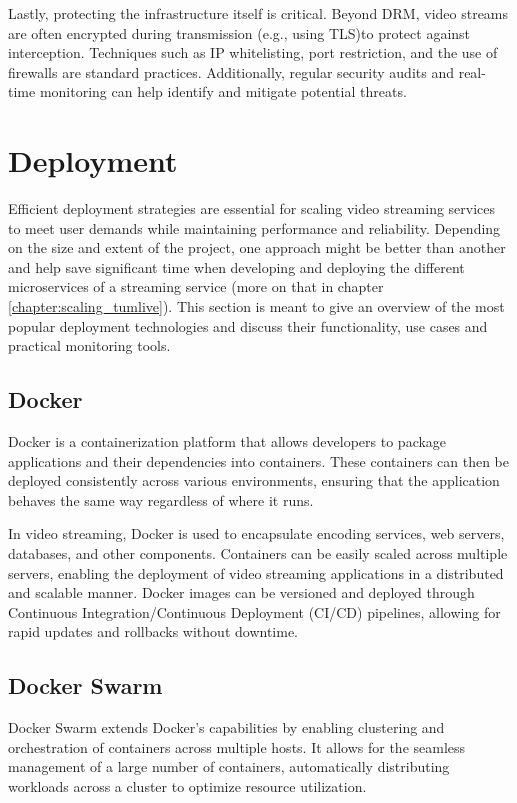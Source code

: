 Lastly, protecting the infrastructure itself is critical. Beyond DRM, video streams are often encrypted during transmission (e.g., using \ac{TLS})to protect against interception. Techniques such as IP whitelisting, port restriction, and the use of firewalls are standard practices. Additionally, regular security audits and real-time monitoring can help identify and mitigate potential threats\cite{network_security}.

\section{Deployment}
Efficient deployment strategies are essential for scaling video streaming services to meet user demands while maintaining performance and reliability. Depending on the size and extent of the project, one approach might be better than another and help save significant time when developing and deploying the different microservices of a streaming service (more on that in chapter \autoref{chapter:scaling_tumlive}). This section is meant to give an overview of the most popular deployment technologies and discuss their functionality, use cases and practical monitoring tools.

\subsection{Docker}
Docker is a containerization platform that allows developers to package applications and their dependencies into containers. These containers can then be deployed consistently across various environments, ensuring that the application behaves the same way regardless of where it runs.

In video streaming, Docker is used to encapsulate encoding services, web servers, databases, and other components. Containers can be easily scaled across multiple servers, enabling the deployment of video streaming applications in a distributed and scalable manner. Docker images can be versioned and deployed through Continuous Integration/Continuous Deployment (CI/CD) pipelines, allowing for rapid updates and rollbacks without downtime\cite{docker_deployment}.

\subsection{Docker Swarm}
Docker Swarm extends Docker's capabilities by enabling clustering and orchestration of containers across multiple hosts. It allows for the seamless management of a large number of containers, automatically distributing workloads across a cluster to optimize resource utilization.

